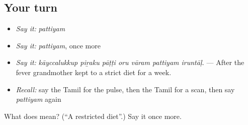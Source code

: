 \subsection*{Your turn}
\begin{itemize}
\raggedright
  \item \emph{Say it:} \emph{pattiyam}
  \item \emph{Say it:} \emph{pattiyam}, once more
  \item \emph{Say it:} \emph{kāyccalukkup piṟaku pāṭṭi oru vāram pattiyam iruntāḷ.} — After the fever grandmother kept to a strict diet for a week.
  \item \emph{Recall:} say the Tamil for the pulse, then the Tamil for a scan, then say \emph{pattiyam} again
\end{itemize}

\begin{tcolorbox}[breakable,colback=teal!4,colframe=teal!35!black,title={Before you move on}]
What does  mean? (\textquotedblleft{}A restricted diet\textquotedblright{}.) Say it once more.
\end{tcolorbox}
